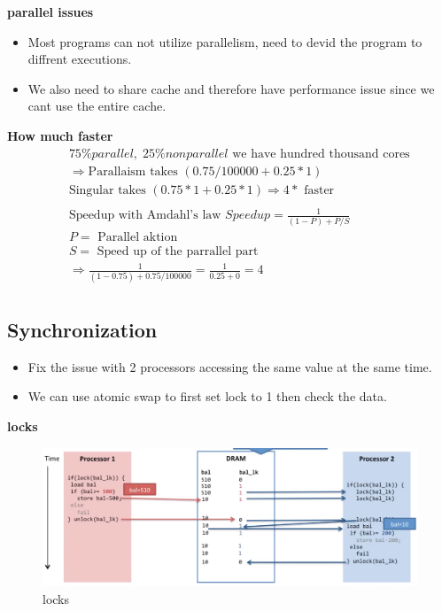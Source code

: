 \textbf{parallel issues}
\begin{itemize}
\item  Most programs can not utilize parallelism, need to devid the program to diffrent executions.
\item  We also need to share cache and therefore have performance issue since we cant use the entire cache.
\end{itemize}


\textbf{How much faster}
\begin{align*}
  &\quad  75\% parallel, \; 25\% non parallel \text{ we have hundred thousand cores } \\
  &\quad  \Rightarrow  \text{Parallaism takes } (0.75/100000 + 0.25*1) \\
  &\quad  \text{Singular takes } (0.75*1 + 0.25*1)  \Rightarrow 4* \text{ faster} \\
  &\quad  \\
  &\quad  \text{Speedup with Amdahl's law } Speedup=\frac{1}{(1-P)+P/S} \\
  &\quad  P= \text{ Parallel aktion} \\
  &\quad  S= \text{ Speed up of the parrallel part} \\
  &\quad  \Rightarrow \frac{1}{(1-0.75)+0.75/100000} = \frac{1}{0.25+0}= 4 \\
\end{align*}


\subsection{Synchronization}
\begin{itemize}
\item  Fix the issue with 2 processors accessing the same value at the same time.
\item  We can use atomic swap to first set lock to 1 then check the data.
\end{itemize}


\textbf{locks}
\begin{figure}[H]
    \centering
    \includegraphics[width=16cm]{image/locks.png}
    \caption{locks}
\end{figure}


